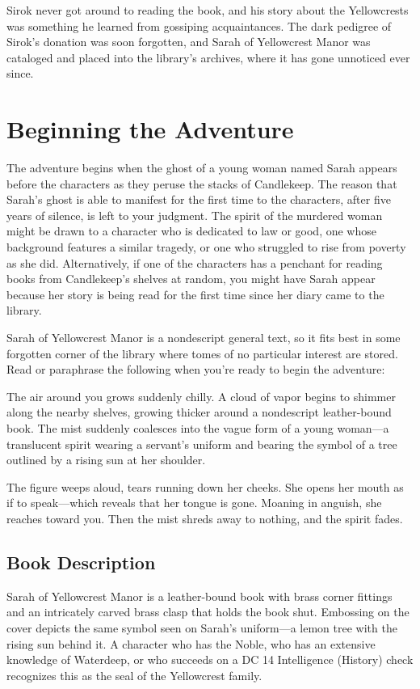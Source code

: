 \documentclass[10pt,a4paper,twoside,bg=print,twocolumn,openany,nodeprecatedcode]{dndbook}
\begin{document}
Sirok never got around to reading the book, and his story about the Yellowcrests was something he learned from gossiping acquaintances. The dark pedigree of Sirok's donation was soon forgotten, and Sarah of Yellowcrest Manor was cataloged and placed into the library's archives, where it has gone unnoticed ever since.

\section{Beginning the Adventure}
The adventure begins when the ghost of a young woman named Sarah appears before the characters as they peruse the stacks of Candlekeep. The reason that Sarah's ghost is able to manifest for the first time to the characters, after five years of silence, is left to your judgment. The spirit of the murdered woman might be drawn to a character who is dedicated to law or good, one whose background features a similar tragedy, or one who struggled to rise from poverty as she did. Alternatively, if one of the characters has a penchant for reading books from Candlekeep's shelves at random, you might have Sarah appear because her story is being read for the first time since her diary came to the library.

Sarah of Yellowcrest Manor is a nondescript general text, so it fits best in some forgotten corner of the library where tomes of no particular interest are stored. Read or paraphrase the following when you're ready to begin the adventure:

\begin{DndReadAloud}{}
The air around you grows suddenly chilly. A cloud of vapor begins to shimmer along the nearby shelves, growing thicker around a nondescript leather-bound book. The mist suddenly coalesces into the vague form of a young woman—a translucent spirit wearing a servant's uniform and bearing the symbol of a tree outlined by a rising sun at her shoulder.

The figure weeps aloud, tears running down her cheeks. She opens her mouth as if to speak—which reveals that her tongue is gone. Moaning in anguish, she reaches toward you. Then the mist shreds away to nothing, and the spirit fades.

\end{DndReadAloud}

\subsection{Book Description}
Sarah of Yellowcrest Manor is a leather-bound book with brass corner fittings and an intricately carved brass clasp that holds the book shut. Embossing on the cover depicts the same symbol seen on Sarah's uniform—a lemon tree with the rising sun behind it. A character who has the Noble, who has an extensive knowledge of Waterdeep, or who succeeds on a DC 14 Intelligence (History) check recognizes this as the seal of the Yellowcrest family.
\end{document}
